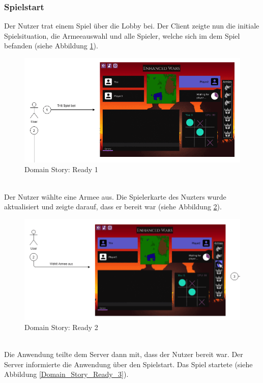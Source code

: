 \documentclass[12pt, titlepage]{scrartcl}
\begin{document}
		    \subsubsection{Spielstart}
		    	Der Nutzer trat einem Spiel \"uber die Lobby bei. Der Client zeigte nun die initiale Spielsituation, die Armeeauswahl und alle Spieler, welche sich im dem Spiel befanden (siehe Abbildung \ref{Domain_Story_Ready_1}).
			    \begin{figure}[H] 
			    	\centering
			    	\includegraphics[width=\textwidth]{images/domain_stories/readyStory1.png}
			    	\caption{Domain Story: Ready 1}
			    	\label{Domain_Story_Ready_1}
			    \end{figure}
				\ \\ Der Nutzer w\"ahlte eine Armee aus. Die Spielerkarte des Nuzters wurde aktualisiert und zeigte darauf, dass er bereit war (siehe Abbildung \ref{Domain_Story_Ready_2}).
			    \begin{figure}[H] 
			    	\centering
			    	\includegraphics[width=\textwidth]{images/domain_stories/readyStory2.png}
			    	\caption{Domain Story: Ready 2}
			    	\label{Domain_Story_Ready_2}
			    \end{figure}
				\ \\ Die Anwendung teilte dem Server dann mit, dass der Nutzer bereit war. Der Server informierte die Anwendung \"uber den Spielstart. Das Spiel startete (siehe Abbildung \ref{Domain_Story_Ready_3}).
\end{document}
